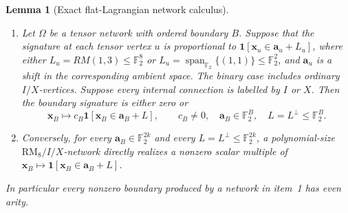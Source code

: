 \documentclass[11pt,letterpaper,onecolumn]{article}
\theoremstyle{plain}
\newtheorem{lemma}[lemma]{Lemma}
\theoremstyle{definition}
\theoremstyle{remark}
\newcommand{\Ftwo}{\mathbb F_2}
\newcommand{\Span}{\operatorname{span}}
\newcommand{\one}{\mathbf 1}
\newcommand{\RMcore}{\mathrm{RM}_8}
\begin{document}
\begin{lemma}[Exact flat-Lagrangian network calculus]
\label{lem:rm-pure-boundary}
\label{lem:rm-flat-contexts}
\begin{enumerate}
\item Let \(\Omega\) be a tensor network with ordered boundary \(B\).
      Suppose that the signature at each tensor vertex \(u\) is
      proportional to \(\one[{\mathbf{x}}_u\in {\mathbf{a}}_u+L_u]\), where either
      \(L_u=RM(1,3)\le\Ftwo^8\) or
      \(L_u=\Span_{\Ftwo}\{(1,1)\}\le\Ftwo^2\), and \({\mathbf{a}}_u\)
      is a shift in the corresponding ambient space.  The binary case
      includes ordinary \(I/X\)-vertices.  Suppose every internal
      connection is labelled by \(I\) or \(X\).  Then the boundary signature
      is either zero or
\begin{equation}
  {\mathbf{x}}_B\longmapsto c_B\one[{\mathbf{x}}_B\in {\mathbf{a}}_B+L],
  \qquad c_B\ne0,\quad {\mathbf{a}}_B\in\Ftwo^B,\quad L=L^\perp\le\Ftwo^B.
  \label{eq:rm-pure-flat}
\end{equation}
\item Conversely, for every \({\mathbf{a}}_B\in\Ftwo^{2k}\) and every
      \(L=L^\perp\le\Ftwo^{2k}\), a polynomial-size
      \(\RMcore/I/X\)-network directly realizes a nonzero scalar multiple of
      \({\mathbf{x}}_B\longmapsto\one[{\mathbf{x}}_B\in {\mathbf{a}}_B+L]\).
\end{enumerate}
In particular every nonzero boundary produced by a network in item~1 has
even arity.
\end{lemma}
\end{document}
